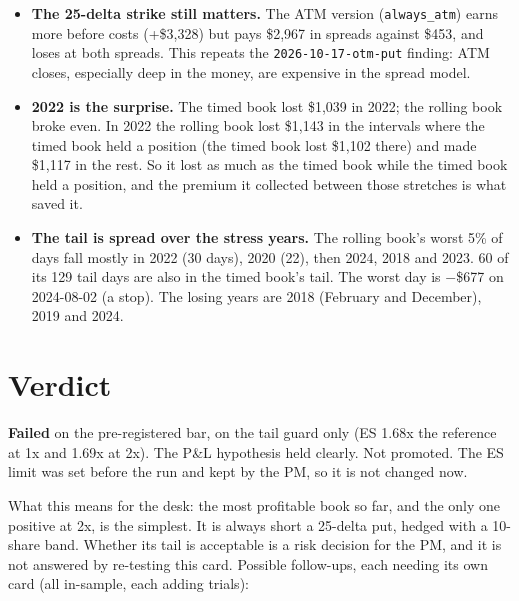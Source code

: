 \documentclass{article}
\begin{document}
\begin{itemize}
\item \textbf{The 25-delta strike still matters.} The ATM version (\texttt{always\_\allowbreak{}atm}) earns more before costs (+\$3,328) but pays \$2,967 in spreads against \$453, and loses at both spreads. This repeats the \texttt{2026-\allowbreak{}10-\allowbreak{}17-\allowbreak{}otm-\allowbreak{}put} finding: ATM closes, especially deep in the money, are expensive in the spread model.

\item \textbf{2022 is the surprise.} The timed book lost \$1,039 in 2022; the rolling book broke even. In 2022 the rolling book lost \$1,143 in the intervals where the timed book held a position (the timed book lost \$1,102 there) and made \$1,117 in the rest. So it lost as much as the timed book while the timed book held a position, and the premium it collected between those stretches is what saved it.

\item \textbf{The tail is spread over the stress years.} The rolling book's worst 5\% of days fall mostly in 2022 (30 days), 2020 (22), then 2024, 2018 and 2023. 60 of its 129 tail days are also in the timed book's tail. The worst day is \ensuremath{-}\$677 on 2024-08-02 (a stop). The losing years are 2018 (February and December), 2019 and 2024.

\end{itemize}

\section{Verdict}

\textbf{Failed} on the pre-registered bar, on the tail guard only (ES 1.68x the reference at 1x and 1.69x at 2x). The P\&L hypothesis held clearly. Not promoted. The ES limit was set before the run and kept by the PM, so it is not changed now.

What this means for the desk: the most profitable book so far, and the only one positive at 2x, is the simplest. It is always short a 25-delta put, hedged with a 10-share band. Whether its tail is acceptable is a risk decision for the PM, and it is not answered by re-testing this card. Possible follow-ups, each needing its own card (all in-sample, each adding trials):
\end{document}
